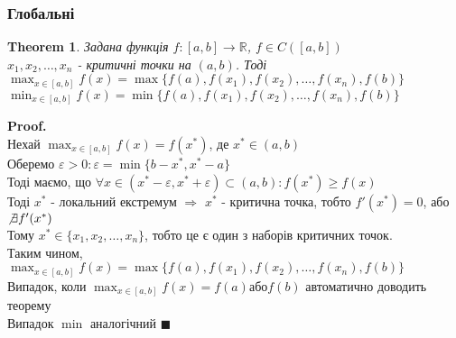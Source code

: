 \documentclass[a4paper, 14pt]{extarticle}
\def\huge{\displaystyle}
\theoremstyle{theoremdd}
\newtheorem{theorem}{Theorem}[subsection]
\theoremstyle{theoremdd}
\theoremstyle{theoremdd}
\theoremstyle{theoremdd}
\theoremstyle{theoremdd}
\theoremstyle{theoremdd}
\theoremstyle{theoremdd}
\theoremstyle{theoremdd}
\newenvironment{pf}{\vspace*{-3mm} \textbf{Proof. \\}}{$\blacksquare$}
\begin{document}
\subsubsection{Глобальні}
\begin{theorem}
Задана функція $f: [a,b] \to \mathbb{R}$, $f \in C([a,b])$\\
$x_1,x_2,\dots,x_n$ - критичні точки на $(a,b)$. Тоді\\
$\huge \max_{x \in [a,b]} f(x) = \max\{f(a),f(x_1),f(x_2),\dots,f(x_n),f(b)\}$\\
$\huge \min_{x \in [a,b]} f(x) = \min\{f(a),f(x_1),f(x_2),\dots,f(x_n),f(b)\}$
\end{theorem}

\begin{pf}
Нехай $\huge \max_{x \in [a,b]} f(x) = f(x^*)$, де $x^* \in (a,b)$\\
Оберемо $\varepsilon > 0: \varepsilon = \min\{b-x^*, x^*-a\}$\\
Тоді маємо, що $\forall x \in (x^*-\varepsilon, x^*+\varepsilon) \subset (a,b): f(x^*) \geq f(x)$\\
Тоді $x^*$ - локальний екстремум $\Rightarrow$ $x^*$ - критична точка, тобто $f'(x^*)=0$, або $\not\exists f'(x^*)$\\
Тому $x^* \in \{x_1,x_2,\dots,x_n\}$, тобто це є один з наборів критичних точок.\\
Таким чином, $\huge \max_{x \in [a,b]} f(x) = \max\{f(a),f(x_1),f(x_2),\dots,f(x_n),f(b)\}$\\
Випадок, коли $\huge \max_{x \in [a,b]} f(x) = f(a) \textrm{або} f(b)$ автоматично доводить теорему\\
Випадок $\min$ аналогічний
\end{pf}
\end{document}
